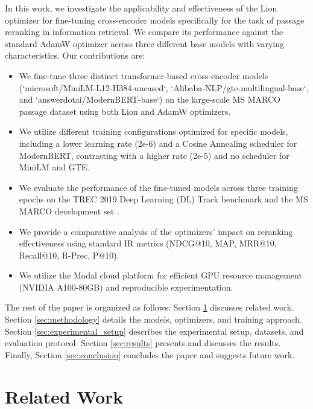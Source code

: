\documentclass[conference]{IEEEtran}
\begin{document}
In this work, we investigate the applicability and effectiveness of the Lion optimizer for fine-tuning cross-encoder models specifically for the task of passage reranking in information retrieval. We compare its performance against the standard AdamW optimizer across three different base models with varying characteristics. Our contributions are:
\begin{itemize}
    \item We fine-tune three distinct transformer-based cross-encoder models (`microsoft/MiniLM-L12-H384-uncased`, `Alibaba-NLP/gte-multilingual-base`, and `answerdotai/ModernBERT-base`) on the large-scale MS MARCO passage dataset \cite{DBLP:journals/corr/NguyenRSGTMD16} using both Lion and AdamW optimizers.
    \item We utilize different training configurations optimized for specific models, including a lower learning rate (2e-6) and a Cosine Annealing scheduler for ModernBERT, contrasting with a higher rate (2e-5) and no scheduler for MiniLM and GTE.
    \item We evaluate the performance of the fine-tuned models across three training epochs on the TREC 2019 Deep Learning (DL) Track \cite{craswell2020overview} benchmark and the MS MARCO development set \cite{DBLP:journals/corr/NguyenRSGTMD16}.
    \item We provide a comparative analysis of the optimizers' impact on reranking effectiveness using standard IR metrics (NDCG@10, MAP, MRR@10, Recall@10, R-Prec, P@10).
    \item We utilize the Modal cloud platform \cite{modal_labs} for efficient GPU resource management (NVIDIA A100-80GB) and reproducible experimentation.
\end{itemize}
The rest of the paper is organized as follows: Section \ref{sec:related_work} discusses related work. Section \ref{sec:methodology} details the models, optimizers, and training approach. Section \ref{sec:experimental_setup} describes the experimental setup, datasets, and evaluation protocol. Section \ref{sec:results} presents and discusses the results. Finally, Section \ref{sec:conclusion} concludes the paper and suggests future work.

\section{Related Work}
\label{sec:related_work}
\end{document}
